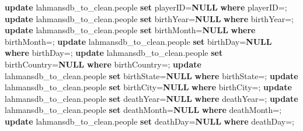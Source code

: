 \documentclass[11pt]{article}
\newenvironment{Shaded}{}{}
\newcommand{\KeywordTok}[1]{\textcolor[rgb]{0.00,0.44,0.13}{\textbf{{#1}}}}
\newcommand{\StringTok}[1]{\textcolor[rgb]{0.25,0.44,0.63}{{#1}}}
\newcommand{\NormalTok}[1]{{#1}}
\newcommand{\OperatorTok}[1]{\textcolor[rgb]{0.40,0.40,0.40}{{#1}}}
\begin{document}
    \begin{Shaded}
\begin{Highlighting}[]
\KeywordTok{update}\NormalTok{ lahmansdb\_to\_clean.people}
\KeywordTok{set}\NormalTok{ playerID}\OperatorTok{=}\KeywordTok{NULL}
\KeywordTok{where}\NormalTok{ playerID}\OperatorTok{=}\StringTok{\textquotesingle{}\textquotesingle{}}\NormalTok{;}
\KeywordTok{update}\NormalTok{ lahmansdb\_to\_clean.people}
\KeywordTok{set}\NormalTok{ birthYear}\OperatorTok{=}\KeywordTok{NULL}
\KeywordTok{where}\NormalTok{ birthYear}\OperatorTok{=}\StringTok{\textquotesingle{}\textquotesingle{}}\NormalTok{;}
\KeywordTok{update}\NormalTok{ lahmansdb\_to\_clean.people}
\KeywordTok{set}\NormalTok{ birthMonth}\OperatorTok{=}\KeywordTok{NULL}
\KeywordTok{where}\NormalTok{ birthMonth}\OperatorTok{=}\StringTok{\textquotesingle{}\textquotesingle{}}\NormalTok{;}
\KeywordTok{update}\NormalTok{ lahmansdb\_to\_clean.people}
\KeywordTok{set}\NormalTok{ birthDay}\OperatorTok{=}\KeywordTok{NULL}
\KeywordTok{where}\NormalTok{ birthDay}\OperatorTok{=}\StringTok{\textquotesingle{}\textquotesingle{}}\NormalTok{;}
\KeywordTok{update}\NormalTok{ lahmansdb\_to\_clean.people}
\KeywordTok{set}\NormalTok{ birthCountry}\OperatorTok{=}\KeywordTok{NULL}
\KeywordTok{where}\NormalTok{ birthCountry}\OperatorTok{=}\StringTok{\textquotesingle{}\textquotesingle{}}\NormalTok{;}
\KeywordTok{update}\NormalTok{ lahmansdb\_to\_clean.people}
\KeywordTok{set}\NormalTok{ birthState}\OperatorTok{=}\KeywordTok{NULL}
\KeywordTok{where}\NormalTok{ birthState}\OperatorTok{=}\StringTok{\textquotesingle{}\textquotesingle{}}\NormalTok{;}
\KeywordTok{update}\NormalTok{ lahmansdb\_to\_clean.people}
\KeywordTok{set}\NormalTok{ birthCity}\OperatorTok{=}\KeywordTok{NULL}
\KeywordTok{where}\NormalTok{ birthCity}\OperatorTok{=}\StringTok{\textquotesingle{}\textquotesingle{}}\NormalTok{;}
\KeywordTok{update}\NormalTok{ lahmansdb\_to\_clean.people}
\KeywordTok{set}\NormalTok{ deathYear}\OperatorTok{=}\KeywordTok{NULL}
\KeywordTok{where}\NormalTok{ deathYear}\OperatorTok{=}\StringTok{\textquotesingle{}\textquotesingle{}}\NormalTok{;}
\KeywordTok{update}\NormalTok{ lahmansdb\_to\_clean.people}
\KeywordTok{set}\NormalTok{ deathMonth}\OperatorTok{=}\KeywordTok{NULL}
\KeywordTok{where}\NormalTok{ deathMonth}\OperatorTok{=}\StringTok{\textquotesingle{}\textquotesingle{}}\NormalTok{;}
\KeywordTok{update}\NormalTok{ lahmansdb\_to\_clean.people}
\KeywordTok{set}\NormalTok{ deathDay}\OperatorTok{=}\KeywordTok{NULL}
\KeywordTok{where}\NormalTok{ deathDay}\OperatorTok{=}\StringTok{\textquotesingle{}\textquotesingle{}}\NormalTok{;}

\end{Highlighting}
\end{Shaded}
\end{document}
